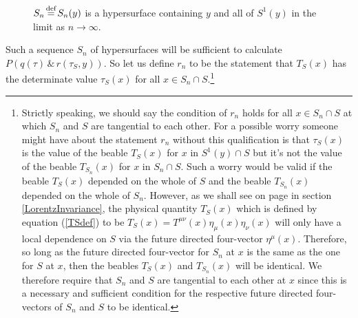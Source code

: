 \begin{figure}[ht!]
\vspace*{2px}
\caption{$S_n\myeq S_n(y)$ is a hypersurface containing $y$ and all of $S^1(y)$ in the limit as $n\rightarrow\infty$.   }
\label{S3}
\end{figure}Such a sequence $S_n$ of hypersurfaces will be sufficient to calculate  $P(q(\tau) \, \&\,  r(\tau_S,y))$. So let us define $r_n$ to be the statement that  $T_S(x)$ has the determinate value $\tau_S(x)$ for all $x\in S_n\cap S$.\footnote{\label{tangentialnote}Strictly speaking, we should say the condition of $r_n$ holds for all $x\in S_n\cap S$ at which $S_n$ and $S$ are tangential to each other. For a possible worry someone might have about the statement $r_n$ without this qualification is that $\tau_S(x)$ is the value of the beable $T_S(x)$ for $x$ in $S^1(y)\cap S$ but it's not the value of the beable $T_{S_n}(x)$ for $x$ in $S_n\cap S$. Such a worry would be valid if the beable $T_S(x)$ depended on the whole of $S$ and the beable $T_{S_n}(x)$ depended on the whole of $S_n$. However, as we shall see on page \pageref{localdependenceS} in section \ref{LorentzInvariance}, the physical quantity $T_S(x)$ which is defined by equation (\ref{TSdef}) to be $T_S(x)=T^{\mu\nu}(x)\eta_{\mu}(x)\eta_{\nu}(x)$ will only have a local dependence on $S$ via the future directed four-vector $\eta^\mu(x)$. Therefore, so long as the future directed four-vector for $S_n$ at $x$ is the same as the one for $S$ at $x$, then the beables $T_{S}(x)$ and  $T_{S_n}(x)$ will be identical. We therefore require that $S_n$ and $S$ are tangential to each other at $x$ since this is a necessary and sufficient condition for the respective future directed four-vectors of $S_n$ and $S$ to be identical.
\newline
\newline
}
